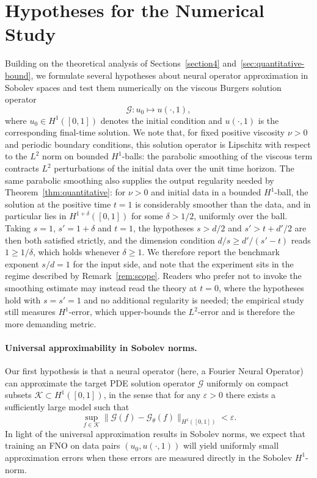 \documentclass[11pt]{article}
\theoremstyle{plain}
\theoremstyle{definition}
\theoremstyle{remark}
\begin{document}
\section{Hypotheses for the Numerical Study}
\label{sec:hypotheses}
Building on the theoretical analysis of Sections~\ref{section4}
and~\ref{sec:quantitative-bound}, we formulate several hypotheses about neural operator approximation in Sobolev spaces and test them numerically on the viscous Burgers solution operator
\[
\mathcal{G} : u_0 \mapsto u(\cdot, 1),
\]
where $u_0 \in H^1([0,1])$ denotes the initial condition and $u(\cdot,1)$ is
the corresponding final-time solution. We note that, for fixed positive
viscosity $\nu > 0$ and periodic boundary conditions, this solution operator
is Lipschitz with respect to the $L^2$ norm on bounded $H^1$-balls: the
parabolic smoothing of the viscous term contracts $L^2$ perturbations of the
initial data over the unit time horizon. The same parabolic smoothing also
supplies the output regularity needed by Theorem~\ref{thm:quantitative}: for
$\nu > 0$ and initial data in a bounded $H^1$-ball, the solution at the
positive time $t = 1$ is considerably smoother than the data, and in
particular lies in $H^{1+\delta}([0,1])$ for some $\delta > 1/2$, uniformly
over the ball. Taking $s = 1$, $s' = 1 + \delta$ and $t = 1$, the hypotheses
$s > d/2$ and $s' > t + d'/2$ are then both satisfied strictly, and the
dimension condition $d/s \ge d'/(s'-t)$ reads $1 \ge 1/\delta$, which holds
whenever $\delta \ge 1$. We therefore report the benchmark exponent
$s/d = 1$ for the input side, and note that the experiment sits in the regime
described by Remark~\ref{rem:scope}. Readers who prefer not to invoke the
smoothing estimate may instead read the theory at $t = 0$, where the
hypotheses hold with $s = s' = 1$ and no additional regularity is needed;
the empirical study still measures $H^1$-error, which upper-bounds the
$L^2$-error and is therefore the more demanding metric.

\paragraph{Universal approximability in Sobolev norms.}
Our first hypothesis is that a neural operator (here, a Fourier Neural
Operator) can approximate the target PDE solution operator $\mathcal{G}$
uniformly on compact subsets $\mathcal{K} \subset H^1([0,1])$, in the sense
that for any $\varepsilon > 0$ there exists a sufficiently large model such
that
\[
\sup_{f \in \mathcal{K}} \| \mathcal{G}(f) - \mathcal{G}_\theta(f)
\|_{H^1([0,1])} < \varepsilon.
\]
In light of the universal approximation results in Sobolev norms, we expect
that training an FNO on data pairs $(u_0, u(\cdot,1))$ will yield uniformly
small approximation errors when these errors are measured directly in the
Sobolev $H^1$-norm.
\end{document}
